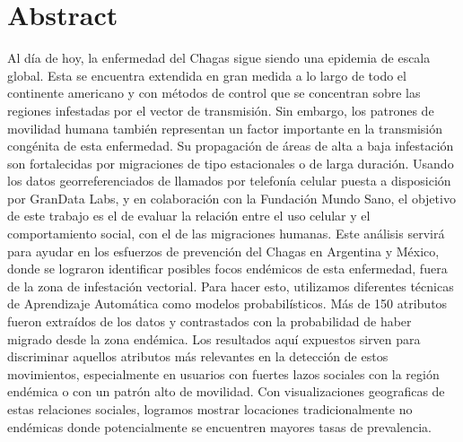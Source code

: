 \chapter{Abstract}
\label{cha:abstract}

Al día de hoy, la enfermedad del Chagas sigue siendo una epidemia de escala global. Esta se encuentra extendida en gran medida a lo largo de todo el continente americano y con métodos de control que se concentran sobre las regiones infestadas por el vector de transmisión. Sin embargo, los patrones de movilidad humana también representan un factor importante en la transmisión congénita de esta enfermedad. Su propagación de áreas de alta a baja infestación son fortalecidas por migraciones de tipo estacionales o de larga duración. Usando los datos georreferenciados de llamados por telefonía celular puesta a disposición por GranData Labs, y en colaboración con la Fundación Mundo Sano, el objetivo de este trabajo es el de evaluar la relación entre el uso celular y el comportamiento social, con el de las migraciones humanas. Este análisis servirá para ayudar en los esfuerzos de prevención del Chagas en Argentina y México, donde se lograron identificar posibles focos endémicos de esta enfermedad, fuera de la zona de infestación vectorial. Para hacer esto, utilizamos diferentes técnicas de Aprendizaje Automática como modelos probabilísticos. Más de 150 atributos fueron extraídos de los datos y contrastados con la probabilidad de haber migrado desde la zona endémica. Los resultados aquí expuestos sirven para discriminar aquellos atributos más relevantes en la detección de estos movimientos, especialmente en usuarios con fuertes lazos sociales con la región endémica o con un patrón alto de movilidad. Con visualizaciones geograficas de estas relaciones sociales, logramos mostrar locaciones tradicionalmente no endémicas donde potencialmente se encuentren mayores tasas de prevalencia.
\\
